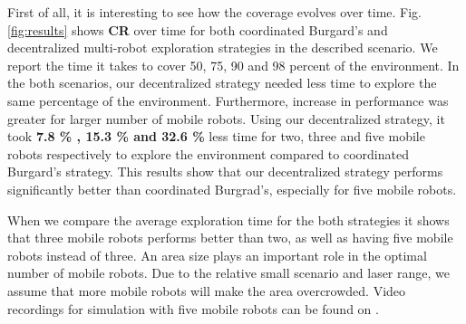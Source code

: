 First of all, it is interesting to see how the coverage evolves over time. Fig. \ref{fig:results} shows \textbf{CR} over time for both coordinated Burgard's and decentralized multi-robot exploration strategies in the described scenario. We report the time it takes to cover 50, 75, 90 and 98 percent of the environment. In the both scenarios, our decentralized strategy needed less time to explore the same percentage of the environment. Furthermore, increase in performance was greater for larger number of mobile robots. Using our decentralized strategy, it took \textbf{7.8 \% , 15.3 \% and 32.6 \%} less time for two, three and five mobile robots respectively to explore the environment compared to coordinated Burgard's strategy. This results show that our decentralized strategy performs significantly better than coordinated Burgrad's, especially for five mobile robots.

When we compare the average exploration time for the both strategies it shows that three mobile robots performs better than two, as well as having five mobile robots instead of three. An area size plays an important role in the optimal number of mobile robots. Due to the relative small scenario and laser range, we assume that more mobile robots will make the area overcrowded. Video recordings for simulation with five mobile robots can be found on \cite{playlist}.

